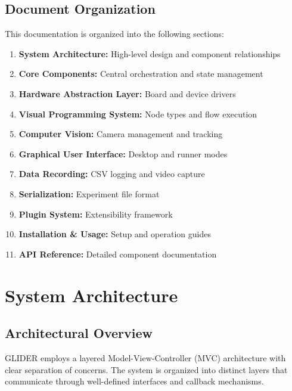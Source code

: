 \documentclass[11pt,a4paper]{article}
\begin{document}
\subsection{Document Organization}

This documentation is organized into the following sections:
\begin{enumerate}    \item \textbf{System Architecture:} High-level design and component relationships
    \item \textbf{Core Components:} Central orchestration and state management
    \item \textbf{Hardware Abstraction Layer:} Board and device drivers
    \item \textbf{Visual Programming System:} Node types and flow execution
    \item \textbf{Computer Vision:} Camera management and tracking
    \item \textbf{Graphical User Interface:} Desktop and runner modes
    \item \textbf{Data Recording:} CSV logging and video capture
    \item \textbf{Serialization:} Experiment file format
    \item \textbf{Plugin System:} Extensibility framework
    \item \textbf{Installation \& Usage:} Setup and operation guides
    \item \textbf{API Reference:} Detailed component documentation
\end{enumerate}

\section{System Architecture}

\subsection{Architectural Overview}

GLIDER employs a layered Model-View-Controller (MVC) architecture with clear separation of concerns. The system is organized into distinct layers that communicate through well-defined interfaces and callback mechanisms.
\end{document}
